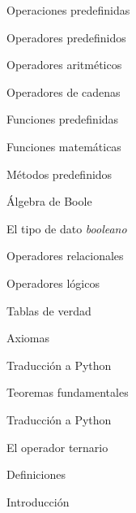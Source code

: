 \begin{longenum}
\begin{longenum}
\begin{longenum}
            \item Operaciones predefinidas
            \begin{longenum}
                \item Operadores predefinidos
                \begin{longenum}
                    \item Operadores aritméticos
                    \item Operadores de cadenas
                \end{longenum}
                \item Funciones predefinidas
                \begin{longenum}
                    \item Funciones matemáticas
                \end{longenum}
                \item Métodos predefinidos
            \end{longenum}
        \end{longenum}
        \item Álgebra de Boole
        \begin{longenum}
            \item El tipo de dato \textit{booleano}
            \item Operadores relacionales
            \item Operadores lógicos
            \begin{longenum}
                \item Tablas de verdad
            \end{longenum}
            \item Axiomas
            \begin{longenum}
                \item Traducción a Python
            \end{longenum}
            \item Teoremas fundamentales
            \begin{longenum}
                \item Traducción a Python
            \end{longenum}
            \item El operador ternario
        \end{longenum}
        \item Definiciones
        \begin{longenum}
            \item Introducción

\end{longenum}
\end{longenum}
\end{longenum}
